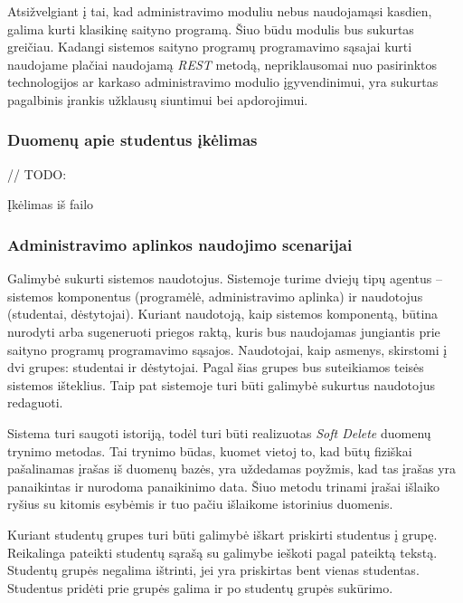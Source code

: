 \documentclass{VUMIFPSkursinis}
\begin{document}
Atsižvelgiant į tai, kad administravimo moduliu nebus naudojamąsi kasdien, galima kurti klasikinę saityno programą. Šiuo būdu modulis bus sukurtas greičiau. Kadangi sistemos saityno programų programavimo sąsajai kurti naudojame plačiai naudojamą \textit{REST} metodą, nepriklausomai nuo pasirinktos technologijos ar karkaso administravimo modulio įgyvendinimui, yra sukurtas pagalbinis įrankis užklausų siuntimui bei apdorojimui.

\subsubsection{Duomenų apie studentus įkėlimas} \label{data-import}

// TODO:

Įkėlimas iš failo

\subsubsection{Administravimo aplinkos naudojimo scenarijai}


Galimybė sukurti sistemos naudotojus. Sistemoje turime dviejų tipų agentus – sistemos komponentus (programėlė, administravimo aplinka) ir naudotojus (studentai, dėstytojai). Kuriant naudotoją, kaip sistemos komponentą, būtina nurodyti arba sugeneruoti priegos raktą, kuris bus naudojamas jungiantis prie saityno programų programavimo sąsajos. Naudotojai, kaip asmenys, skirstomi į dvi grupes: studentai ir dėstytojai. Pagal šias grupes bus suteikiamos teisės sistemos išteklius. Taip pat sistemoje turi būti galimybė sukurtus naudotojus redaguoti.

Sistema turi saugoti istoriją, todėl turi būti realizuotas \textit{Soft Delete} duomenų trynimo metodas. Tai trynimo būdas, kuomet vietoj to, kad būtų fiziškai pašalinamas įrašas iš duomenų bazės, yra uždedamas poyžmis, kad tas įrašas yra panaikintas ir nurodoma panaikinimo data. Šiuo metodu trinami įrašai išlaiko ryšius su kitomis esybėmis ir tuo pačiu išlaikome istorinius duomenis.


Kuriant studentų grupes turi būti galimybė iškart priskirti studentus į grupę. Reikalinga pateikti studentų sąrašą su galimybe ieškoti pagal pateiktą tekstą. Studentų grupės negalima ištrinti, jei yra priskirtas bent vienas studentas. Studentus pridėti prie grupės galima ir po studentų grupės sukūrimo.
\end{document}
